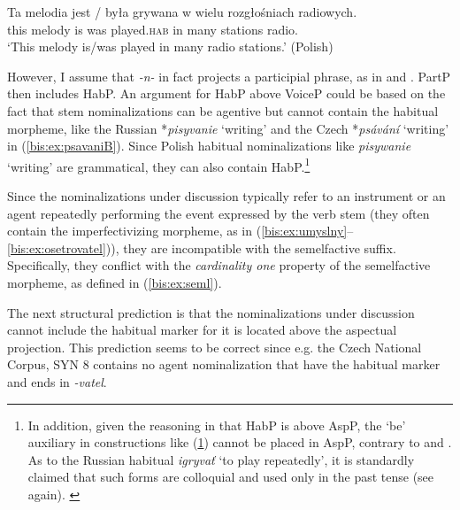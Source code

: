 \documentclass[output=paper]{langscibook}
\begin{document}
\ea\label{bis:ex:ta}
\gll 
Ta 		melodia 	jest / była 	grywana 		w 	wielu 	rozgłośniach radiowych. \\ 
this 	melody 	is {} was 		played.\textsc{hab}	in 	many stations radio. \\
\glt `This 	melody 	is/was 		played	in 	many 	radio stations.'
\hfill (Polish)
\z

\noindent However, I assume that \textit{-n-} in fact projects a participial phrase, as in \citet{Biskup2016} and \citet[Chapter 4]{Biskup2019}. PartP then includes HabP. An argument for HabP above VoiceP could be based on the fact that stem nominalizations can be agentive but cannot contain the habitual morpheme, like the Russian *\textit{pisyvanie} ‘writing’ and the Czech *\textit{psávání} ‘writing’ in (\ref{bis:ex:psavaniB}). Since Polish habitual nominalizations like \textit{pisywanie} ‘writing’ are grammatical, they can also contain HabP.\footnote{In addition, given the reasoning in  that HabP is above AspP, the ‘be’ auxiliary in constructions like (\ref{bis:ex:jan}) cannot be placed in AspP, contrary to \citet{Blaszczak.Klimek-Jankowska2012} and \citet{Blaszczak.etal2014}. As to the Russian habitual \textit{igryvať} ‘to play repeatedly’, it is standardly claimed that such forms are colloquial and used only in the past tense (see  again).
\ea\label{bis:ex:jan}
\z
\z
}

Since the nominalizations under discussion typically refer to an instrument or an agent repeatedly performing the event expressed by the verb stem (they often contain the imperfectivizing morpheme, as in (\ref{bis:ex:umyslny}--\ref{bis:ex:osetrovatel})), they are incompatible with the semelfactive suffix. Specifically, they conflict with the \textit{cardinality one} property of the semelfactive morpheme, as defined in (\ref{bis:ex:seml}).

The next structural prediction is that the nominalizations under discussion cannot include the habitual marker for it is located above the aspectual projection. This prediction seems to be correct since e.g. the Czech National Corpus, SYN 8 \citep{CNK} contains no agent nominalization that have the habitual marker and ends in \textit{-vatel}.
\end{document}
